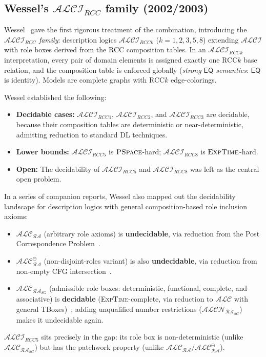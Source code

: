\documentclass[
]{ceurart}
\theoremstyle{definition}
\newcommand{\ALCI}{\ensuremath{\mathcal{ALCI}}}
\newcommand{\ALC}{\ensuremath{\mathcal{ALC}}}
\newcommand{\ALCIRCC}[1]{\ensuremath{\mathcal{ALCI}_{\mathit{RCC#1}}}}
\newcommand{\EQ}{\ensuremath{\mathsf{EQ}}}
\newcommand{\EXPTIME}{\textsc{ExpTime}}
\newcommand{\PSPACE}{\textsc{PSpace}}
\begin{document}
\subsection{Wessel's $\ALCIRCC{}$ family (2002/2003)}

Wessel~\cite{Wessel2002,Wessel2003,Wessel2001} gave the first rigorous treatment
of the combination, introducing the \emph{$\ALCIRCC{}$ family}:
description logics $\ALCIRCC{k}$ ($k = 1,2,3,5,8$) extending $\ALCI$
with role boxes derived from the RCC composition tables.
In an $\ALCIRCC{k}$ interpretation, every pair of domain elements is
assigned exactly one RCC$k$ base relation, and the composition table
is enforced globally (\emph{strong $\EQ$ semantics}: $\EQ$ is identity).
Models are complete graphs with RCC$k$ edge-colorings.

Wessel established the following:
\begin{itemize}
  \item \textbf{Decidable cases:} $\ALCIRCC{1}$, $\ALCIRCC{2}$,
    and $\ALCIRCC{3}$ are decidable, because their composition
    tables are deterministic or near-deterministic, admitting
    reduction to standard DL techniques.
  \item \textbf{Lower bounds:} $\ALCIRCC{5}$ is $\PSPACE$-hard;
    $\ALCIRCC{8}$ is $\EXPTIME$-hard.
  \item \textbf{Open:} The decidability of $\ALCIRCC{5}$ and
    $\ALCIRCC{8}$ was left as the central open problem.
\end{itemize}

In a series of companion reports, Wessel also mapped out the
decidability landscape for description logics with general
composition-based role inclusion axioms:
\begin{itemize}
  \item $\ALC_{\mathcal{RA}}$ (arbitrary role axioms) is
    \textbf{undecidable}, via reduction from the Post
    Correspondence Problem~\cite{Wessel2001RA}.
  \item $\ALC_{\mathcal{RA}}^\ominus$ (non-disjoint-roles
    variant) is also \textbf{undecidable}, via reduction from
    non-empty CFG intersection~\cite{Wessel2000RA}.
  \item $\ALC_{\mathcal{RA}_{SG}}$ (admissible role boxes:
    deterministic, functional, complete, and associative) is
    \textbf{decidable} (\EXPTIME-complete, via reduction to
    $\ALC$ with general TBoxes)~\cite{Wessel2000SG}; adding
    unqualified number restrictions ($\mathcal{ALCN}_{\mathcal{RA}_{SG}}$)
    makes it undecidable again.
\end{itemize}
$\ALCIRCC{5}$ sits precisely in the gap: its role box is
non-deterministic (unlike $\ALC_{\mathcal{RA}_{SG}}$) but
has the patchwork property (unlike
$\ALC_{\mathcal{RA}}/\ALC_{\mathcal{RA}}^\ominus$).
\end{document}
